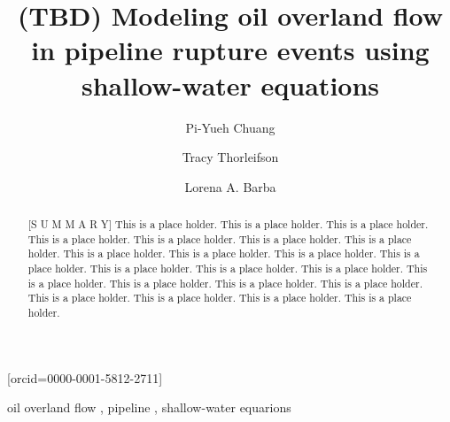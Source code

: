 
\title[mode=title]{(TBD) Modeling oil overland flow in pipeline rupture events using shallow-water equations}

\author[1]{Pi-Yueh Chuang}

\author[2]{Tracy Thorleifson}

\author[1]{Lorena A. Barba}[orcid=0000-0001-5812-2711]
\cormark[1] 

\address[1]{Department of Mechanical and Aerospace Engineering, The George Washington University, Washington, DC, USA}
\address[2]{G2 Integrated Solutions, Houston, TX 77042, USA}

\begin{abstract}[S U M M A R Y]
    This is a place holder.
    This is a place holder.
    This is a place holder.
    This is a place holder.
    This is a place holder.
    This is a place holder.
    This is a place holder.
    This is a place holder.
    This is a place holder.
    This is a place holder.
    This is a place holder.
    This is a place holder.
    This is a place holder.
    This is a place holder.
    This is a place holder.
    This is a place holder.
    This is a place holder.
    This is a place holder.
    This is a place holder.
    This is a place holder.
    This is a place holder.
    This is a place holder.
\end{abstract}

\begin{keywords}
    oil overland flow \sep
    pipeline \sep
    shallow-water equarions
\end{keywords}

